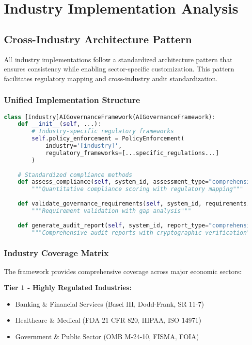 \documentclass[12pt,a4paper]{article}
\begin{document}
\section{Industry Implementation Analysis}

\subsection{Cross-Industry Architecture Pattern}

All industry implementations follow a standardized architecture pattern that ensures consistency while enabling sector-specific customization. This pattern facilitates regulatory mapping and cross-industry audit standardization.

\subsubsection{Unified Implementation Structure}

\begin{lstlisting}[language=Python, caption=Industry Framework Pattern]
class [Industry]AIGovernanceFramework(AIGovernanceFramework):
    def __init__(self, ...):
        # Industry-specific regulatory frameworks
        self.policy_enforcement = PolicyEnforcement(
            industry='[industry]',
            regulatory_frameworks=[...specific_regulations...]
        )
    
    # Standardized compliance methods
    def assess_compliance(self, system_id, assessment_type="comprehensive"):
        """Quantitative compliance scoring with regulatory mapping"""
    
    def validate_governance_requirements(self, system_id, requirements):
        """Requirement validation with gap analysis"""
    
    def generate_audit_report(self, system_id, report_type="comprehensive"):
        """Comprehensive audit reports with cryptographic verification"""
\end{lstlisting}

\subsubsection{Industry Coverage Matrix}

The framework provides comprehensive coverage across major economic sectors:

\textbf{Tier 1 - Highly Regulated Industries:}
\begin{itemize}
\item Banking \& Financial Services (Basel III, Dodd-Frank, SR 11-7)
\item Healthcare \& Medical (FDA 21 CFR 820, HIPAA, ISO 14971)
\item Government \& Public Sector (OMB M-24-10, FISMA, FOIA)
\end{itemize}
\end{document}
